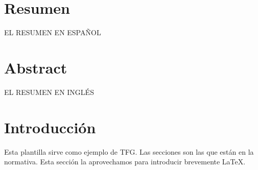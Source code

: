 \documentclass[12pt,a4paper,twoside]{book}
\begin{document}
\chapter*{Resumen}
\thispagestyle{empty}
EL RESUMEN EN ESPAÑOL
\thispagestyle{empty}

\chapter*{Abstract}
\thispagestyle{empty}
EL RESUMEN EN INGLÉS


\setcounter{page}{1}
\tableofcontents
\newpage
\listoftables
\newpage
\listoffigures
\newpage




\pagestyle{fancy}
\setcounter{page}{1}

\chapter{Introducción}
Esta plantilla sirve como ejemplo de TFG. Las secciones son las que están en la normativa. Esta sección la aprovechamos para introducir brevemente \LaTeX.
\par
\end{document}

